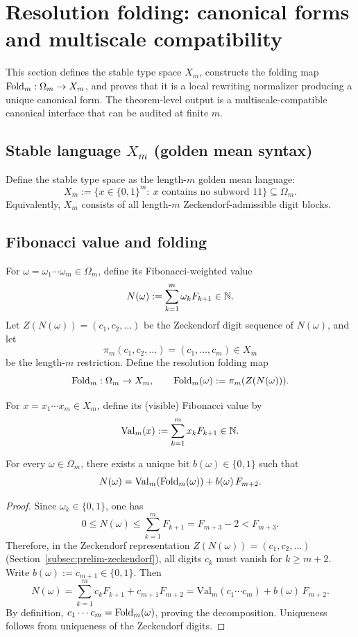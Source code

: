 \section{Resolution folding: canonical forms and multiscale compatibility}\label{sec:folding}

This section defines the stable type space $X_m$, constructs the folding map $\mathrm{Fold}_m:\Omega_m\to X_m$, and proves that it is a local rewriting normalizer producing a unique canonical form.
The theorem-level output is a multiscale-compatible canonical interface that can be audited at finite $m$.

\subsection{Stable language $X_m$ (golden mean syntax)}\label{subsec:Xm}
Define the stable type space as the length-$m$ golden mean language:
\[
X_m:=\{x\in\{0,1\}^m:\ \text{$x$ contains no subword $11$}\}\subseteq \Omega_m.
\]
Equivalently, $X_m$ consists of all length-$m$ Zeckendorf-admissible digit blocks.

\subsection{Fibonacci value and folding}\label{subsec:fold-definition}
For $\omega=\omega_1\cdots\omega_m\in\Omega_m$, define its Fibonacci-weighted value
\[
N(\omega):=\sum_{k=1}^{m}\omega_k F_{k+1}\in\mathbb{N}.
\]
Let $Z(N(\omega))=(c_1,c_2,\dots)$ be the Zeckendorf digit sequence of $N(\omega)$, and let
\[
\pi_m(c_1,c_2,\dots)=(c_1,\dots,c_m)\in X_m
\]
be the length-$m$ restriction. Define the resolution folding map
\[
\mathrm{Fold}_m:\Omega_m\to X_m,\qquad \mathrm{Fold}_m(\omega):=\pi_m(Z(N(\omega))).
\]

\begin{definition}\label{def:type-visible-value}
For $x=x_1\cdots x_m\in X_m$, define its (visible) Fibonacci value by
\[
\mathrm{Val}_m(x):=\sum_{k=1}^{m} x_k F_{k+1}\in\mathbb{N}.
\]
\end{definition}

\begin{lemma}\label{lem:one-hidden-bit}
For every $\omega\in\Omega_m$, there exists a unique bit $b(\omega)\in\{0,1\}$ such that
\[
N(\omega)=\mathrm{Val}_m(\mathrm{Fold}_m(\omega)) + b(\omega)\,F_{m+2}.
\]
\end{lemma}
\begin{proof}
Since $\omega_k\in\{0,1\}$, one has
\[
0\le N(\omega)\le \sum_{k=1}^{m} F_{k+1}=F_{m+3}-2<F_{m+3}.
\]
Therefore, in the Zeckendorf representation $Z(N(\omega))=(c_1,c_2,\dots)$ (Section~\ref{subsec:prelim-zeckendorf}), all digits $c_k$ must vanish for $k\ge m+2$.
Write $b(\omega):=c_{m+1}\in\{0,1\}$.
Then
\[
N(\omega)=\sum_{k=1}^{m} c_k F_{k+1} + c_{m+1}F_{m+2}
=\mathrm{Val}_m(c_1\cdots c_m) + b(\omega)\,F_{m+2}.
\]
By definition, $c_1\cdots c_m=\mathrm{Fold}_m(\omega)$, proving the decomposition.
Uniqueness follows from uniqueness of the Zeckendorf digits.
\end{proof}

